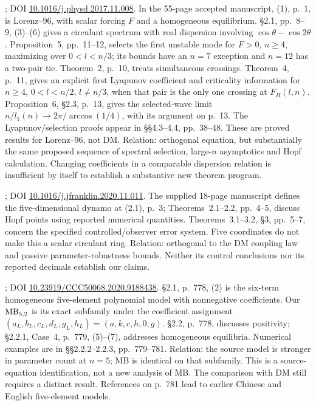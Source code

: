 \begin{description}[style=nextline,leftmargin=0pt,labelwidth=0pt,labelsep=0pt]
\item[S03: van Kekem and Sterk (2018): the closest theorem-program precedent.]
\cite{vanKekemSterk2018}; DOI
\href{https://doi.org/10.1016/j.physd.2017.11.008}{10.1016/j.physd.2017.11.008}.
In the 55-page accepted manuscript, (1), p.~1, is Lorenz--96, with
scalar forcing $F$ and a homogeneous equilibrium. \S2.1, pp.~8--9,
(3)--(6) gives a circulant spectrum with real dispersion involving
$\cos\theta-\cos2\theta$. Proposition~5, pp.~11--12, selects the first
unstable mode for $F>0$, $n\geq4$, maximizing over $0<l<n/3$;
its bounds have an $n=7$ exception and $n=12$ has a two-pair tie.
Theorem~2, p.~10, treats simultaneous crossings. Theorem~4, p.~11,
gives an explicit first Lyapunov coefficient and criticality information
for $n\geq4$, $0<l<n/2$, $l\neq n/3$, when that pair is the only
one crossing at $F_H(l,n)$.
Proposition~6, \S2.3, p.~13, gives the selected-wave limit
$n/l_1(n)\to 2\pi/\arccos(1/4)$, with its argument on p.~13.
The Lyapunov/selection proofs appear in \S\S4.3--4.4, pp.~38--48.
These are proved results for Lorenz--96, not DM.
Relation: orthogonal equation, but substantially the same proposed
sequence of spectral selection, large-$n$ asymptotics and Hopf calculation.
Changing coefficients in a comparable dispersion relation is insufficient
by itself to establish a substantive new theorem program.

\item[S04: Wei et al. (2021).]
\cite{WeiEtAl2021}; DOI \href{https://doi.org/10.1016/j.jfranklin.2020.11.011}{10.1016/j.jfranklin.2020.11.011}.
The supplied 18-page manuscript defines the five-dimensional dynamo at
(2.1), p.~3; Theorems~2.1--2.2, pp.~4--5, discuss Hopf points using
reported numerical quantities. Theorems~3.1--3.2, \S3, pp.~5--7,
concern the specified controlled/observer error system. Five coordinates
do not make this a scalar circulant ring. Relation: orthogonal to the
DM coupling law and passive parameter-robustness bounds. Neither its
control conclusions nor its reported decimals establish our claims.

\item[S05: Lin and Han (2020): exact comparator overlap at five nodes.]
\cite{LinHan2020}; DOI \href{https://doi.org/10.23919/CCC50068.2020.9188438}{10.23919/CCC50068.2020.9188438}.
\S2.1, p.~778, (2) is the six-term homogeneous five-element polynomial
model with nonnegative coefficients. Our $\mathrm{MB}_{5,2}$ is its exact
subfamily under the coefficient assignment
$(a_L,b_L,c_L,d_L,g_L,h_L)=(a,k,c,h,0,g)$.
\S2.2, p.~778, discusses positivity; \S2.2.1, Case~4, p.~779,
(5)--(7), addresses homogeneous equilibria. Numerical examples are in
\S\S2.2.2--2.2.3, pp.~779--781. Relation: the source model is
stronger in parameter count at $n=5$; MB is identical on that subfamily.
This is a source-equation identification, not a new analysis of MB.
The comparison with DM still requires a distinct result. References on
p.~781 lead to earlier Chinese and English five-element models.


\end{description}
